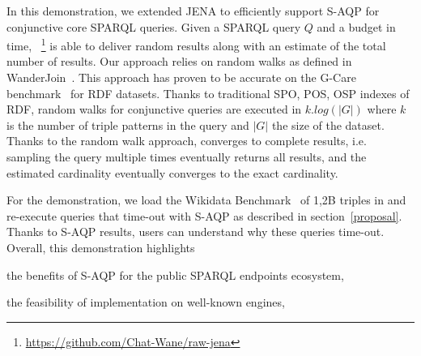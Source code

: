   In this demonstration, we extended JENA to efficiently support
  S-AQP for conjunctive core
  SPARQL queries. Given a SPARQL query $Q$ and a budget in time,
  \NAME~\footnote{\url{https://github.com/Chat-Wane/raw-jena}} is able
  to deliver random results along with an estimate of the
  total number of results. Our approach relies on random
 walks as defined in WanderJoin~\cite{li2019wanderjoin}. This approach
 has proven to be accurate on the G-Care
 benchmark~\cite{DBLP:conf/sigmod/ParkKBKHH20} for RDF datasets. Thanks
 to traditional SPO, POS, OSP indexes of RDF, random
 walks for conjunctive queries are executed in $k.log(|G|)$ where
 $k$ is the number of triple patterns in the query and $|G|$ the size
 of the dataset. Thanks to the random walk approach, \NAME converges
 to complete results, i.e. sampling the query multiple times eventually
 returns all results, and the estimated cardinality eventually converges
 to the exact cardinality.

 \noindent For the demonstration, we load the Wikidata
 Benchmark~\cite{angles2022wdbench} of 1,2B triples in \NAME and
 re-execute queries that time-out with S-AQP as described in
 section~\ref{proposal}. Thanks to S-AQP results, users can understand
 why these queries time-out. Overall, this demonstration highlights
\begin{inparaenum}[(i)]
\item the benefits of S-AQP for the public SPARQL endpoints ecosystem,
\item the feasibility of implementation on well-known engines,
\end{inparaenum}


